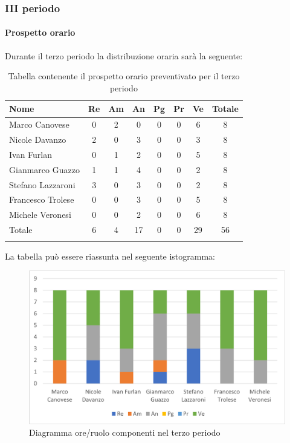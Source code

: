 	\subsubsection{III periodo}
	\paragraph{Prospetto orario}
			Durante il terzo periodo la distribuzione oraria sarà la seguente:
			
			\begin{longtable}{|l|c|c|c|c|c|c|c|}
				\hline
				\rowcolor{lighter-grayer}
				\textbf{Nome} & \textbf{Re} & \textbf{Am} & \textbf{An} & \textbf{Pg}  & \textbf{Pr}   & \textbf{Ve} & \textbf{Totale} \\
				\hline
				\endfirsthead
				
				\hline
				Marco Canovese & 0 & 2 & 0 & 0 & 0 & 6 & 8\\
				\hline
				\hline
				Nicole Davanzo & 2 & 0 & 3 & 0 & 0 & 3 & 8\\
				\hline
				\hline
				Ivan Furlan & 0 & 1 & 2 & 0 & 0 & 5 & 8\\
				\hline
				\hline
				Gianmarco Guazzo & 1 & 1 & 4 & 0 & 0 & 2 & 8\\
				\hline
				\hline
				Stefano Lazzaroni & 3 & 0 & 3 & 0 & 0 & 2 & 8\\
				\hline
				\hline
				Francesco Trolese & 0 & 0 & 3 & 0 & 0 & 5 & 8\\
				\hline
				\hline
				Michele Veronesi & 0 & 0 & 2 & 0 & 0 & 6 & 8\\
				\hline 
				\hline
				Totale & 6 & 4 & 17 & 0 & 0 & 29 & 56\\
				\hline
				\rowcolor{white} 
				\caption{Tabella contenente il prospetto orario preventivato per il terzo periodo}
			\end{longtable}

		
			La tabella può essere riassunta nel seguente istogramma:
		
			\begin{figure}[H]
				\centering
				\includegraphics[width=0.8\linewidth]{res/images/preventivo/dettaglio_analisi/3-1.png}
				\caption{Diagramma ore/ruolo componenti nel terzo periodo}
				\label{fig:diagramma suddivisione ruoli terzo periodo analisi}
			\end{figure}
		
